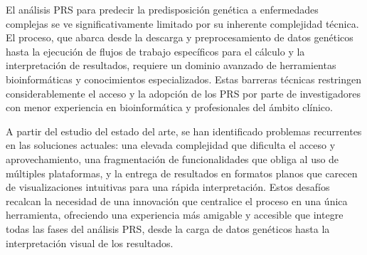 El análisis PRS para predecir la predisposición genética a enfermedades complejas se ve significativamente limitado por su inherente complejidad técnica. El proceso, que abarca desde la descarga y preprocesamiento de datos genéticos hasta la ejecución de flujos de trabajo específicos para el cálculo y la interpretación de resultados, requiere un dominio avanzado de herramientas bioinformáticas y conocimientos especializados. Estas barreras técnicas restringen considerablemente el acceso y la adopción de los PRS por parte de investigadores con menor experiencia en bioinformática y profesionales del ámbito clínico.

A partir del estudio del estado del arte, se han identificado problemas recurrentes en las soluciones actuales: una elevada complejidad que dificulta el acceso y aprovechamiento, una fragmentación de funcionalidades que obliga al uso de múltiples plataformas, y la entrega de resultados en formatos planos que carecen de visualizaciones intuitivas para una rápida interpretación. Estos desafíos recalcan la necesidad de una innovación que centralice el proceso en una única herramienta, ofreciendo una experiencia más amigable y accesible que integre todas las fases del análisis PRS, desde la carga de datos genéticos hasta la interpretación visual de los resultados.